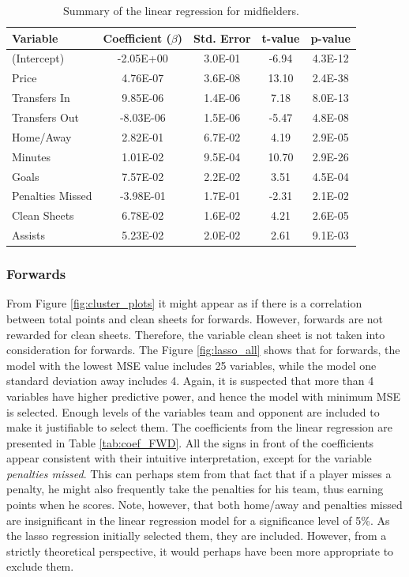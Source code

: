 \begin{table}[!htb]
\centering
\begin{tabular}{|l|c|c|c|c|}
\hline
Variable         & Coefficient ($\beta$)  & Std. Error &  t-value & p-value \\ \hline
(Intercept)  \Tstrut     & -2.05E+00 & 3.0E-01    & -6.94   & 4.3E-12 \\
Price            & 4.76E-07  & 3.6E-08    & 13.10   & 2.4E-38 \\
Transfers In     & 9.85E-06  & 1.4E-06    & 7.18    & 8.0E-13 \\
Transfers Out    & -8.03E-06 & 1.5E-06    & -5.47   & 4.8E-08 \\
Home/Away        & 2.82E-01  & 6.7E-02    & 4.19    & 2.9E-05 \\
Minutes          & 1.01E-02  & 9.5E-04    & 10.70   & 2.9E-26 \\
Goals            & 7.57E-02  & 2.2E-02    & 3.51    & 4.5E-04 \\
Penalties Missed & -3.98E-01 & 1.7E-01    & -2.31   & 2.1E-02 \\
Clean Sheets     & 6.78E-02  & 1.6E-02    & 4.21    & 2.6E-05 \\
Assists      \Bstrut     & 5.23E-02  & 2.0E-02    & 2.61    & 9.1E-03 \\
\hline
\end{tabular}
\caption{Summary of the linear regression for midfielders.}
\label{tab:coef_MID}
\end{table}


\subsubsection{Forwards}

From Figure \ref{fig:cluster_plots} it might appear as if there is a correlation between total points and clean sheets for forwards. However, forwards are not rewarded for clean sheets. Therefore, the variable clean sheet is not taken into consideration for forwards. The Figure \ref{fig:lasso_all} shows that for forwards, the model with the lowest MSE value includes 25 variables, while the model one standard deviation away includes 4. Again, it is suspected that more than 4 variables have higher predictive power, and hence the model with minimum MSE is selected. Enough levels of the variables team and opponent are included to make it justifiable to select them. The coefficients from the linear regression are presented in Table \ref{tab:coef_FWD}. All the signs in front of the coefficients appear consistent with their intuitive interpretation, except for the variable \textit{penalties missed}. This can perhaps stem from that fact that if a player misses a penalty, he might also frequently take the penalties for his team, thus earning points when he scores. Note, however, that both home/away and penalties missed are insignificant in the linear regression model for a significance level of 5\%. As the lasso regression initially selected them, they are included. However, from a strictly theoretical perspective, it would perhaps have been more appropriate to exclude them.

